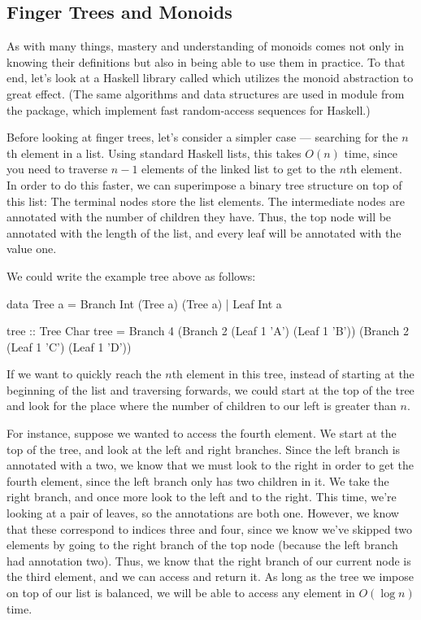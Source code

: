 \subsection*{Finger Trees and Monoids}
As with many things, mastery and understanding of monoids comes not only in knowing their
definitions but also in being able to use them in practice. To that end, let's look at a Haskell
library called  which utilizes the monoid abstraction to great effect. (The same
algorithms and data structures are used in  module from the
 package, which implement fast random-access sequences for Haskell.)

Before looking at finger trees, let's consider a simpler case --- searching for the $n$th element in
a list. Using standard Haskell lists, this takes $O(n)$ time, since you need to traverse $n - 1$
elements of the linked list to get to the $n$th element. In order to do this faster, we can
superimpose a binary tree structure on top of this list:
The terminal nodes store the list elements. The intermediate nodes are annotated with the number of
children they have. Thus, the top node will be annotated with the length of the list, and every leaf
will be annotated with the value one.

We could write the example tree above as follows:
\begin{haskell}
data Tree a = Branch Int (Tree a) (Tree a) | Leaf Int a

tree :: Tree Char
tree =
  Branch 4
    (Branch 2 (Leaf 1 'A') (Leaf 1 'B'))
    (Branch 2 (Leaf 1 'C') (Leaf 1 'D'))
\end{haskell}

If we want to quickly reach the $n$th element in this tree, instead of starting at the beginning of
the list and traversing forwards, we could start at the top of the tree and look for the place where
the number of children to our left is greater than $n$. 

For instance, suppose we wanted to access the fourth element. We start at the top of the tree, and
look at the left and right branches. Since the left branch is annotated with a two, we know that we
must look to the right in order to get the fourth element, since the left branch only has two
children in it. We take the right branch, and once more look to the left and to the right. This
time, we're looking at a pair of leaves, so the annotations are both one. However, we know that
these correspond to indices three and four, since we know we've skipped two elements by going to the
right branch of the top node (because the left branch had annotation two). Thus, we know that the
right branch of our current node is the third element, and we can access and return it. As long as
the tree we impose on top of our list is balanced, we will be able to access any element in $O(\log
n)$ time.

